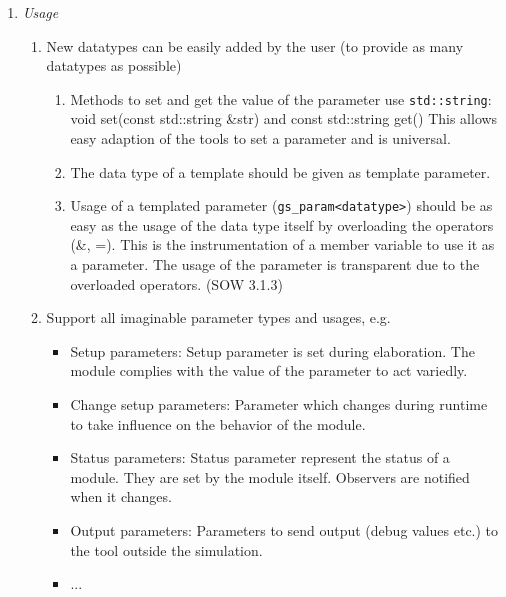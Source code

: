 \begin{enumerate}
	\item {\em Usage} 
	\begin{enumerate}
		\item New datatypes can be easily added by the user (to provide as many datatypes as possible) 
		\begin{enumerate}
			\item Methods to set and get the value of the parameter use \lstinline|std::string|: \newline  void set(const std::string \&str) and const std::string get()  \newline  This allows easy adaption of the tools to set a parameter and is universal. 
			\item The data type of a template should be given as template parameter.  \item Usage of a templated parameter (\lstinline|gs_param<datatype>|) should be as easy as the usage of the data type itself by overloading the operators (\&, =). This is the instrumentation of a member variable to use it as a parameter. The usage of the parameter is transparent due to the overloaded operators. (SOW 3.1.3) 
		\end{enumerate}
		\item Support all imaginable parameter types and usages, e.g. 
		\begin{itemize}
			\item Setup parameters: Setup parameter is set during elaboration. The module complies with the value of the parameter to act variedly. 
			\item Change setup parameters: Parameter which changes during runtime to take influence on the behavior of the module. 
			\item Status parameters: Status parameter represent the status of a module. They are set by the module itself. Observers are notified when it changes. 
			\item Output parameters: Parameters to send output (debug values etc.) to the tool outside the simulation. 
			\item ... 
		\end{itemize}
	\end{enumerate}


\end{enumerate}

